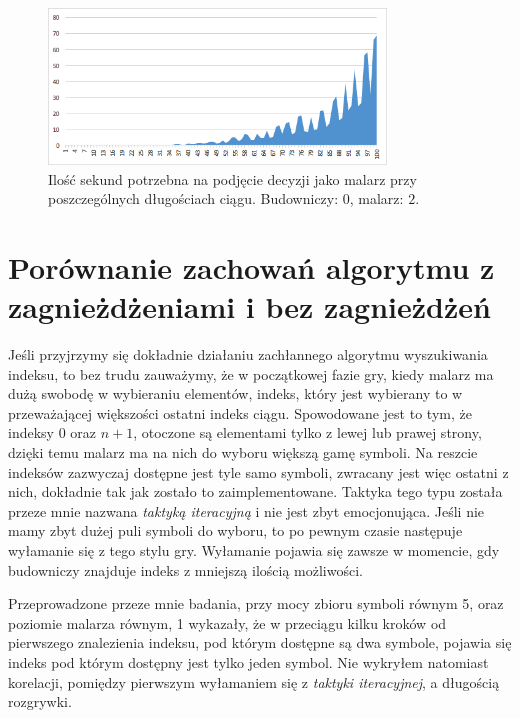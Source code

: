 \documentclass[document]{xmgr}
\begin{document}
\begin{figure}[tbh]
    \centering
    \includegraphics[width = 0.8\textwidth]{images/timePainter2Builder0}
    \caption{Ilość sekund potrzebna na podjęcie decyzji jako malarz przy poszczególnych długościach ciągu. Budowniczy: $0$, malarz: $2$.}
    \label{fig:painter2builder0}
\end{figure}


\section{Porównanie zachowań algorytmu z zagnieżdżeniami i bez zagnieżdżeń}
Jeśli przyjrzymy się dokładnie działaniu zachłannego algorytmu wyszukiwania indeksu, to bez trudu zauważymy, że w początkowej fazie gry, kiedy malarz ma dużą swobodę w wybieraniu elementów, indeks, który jest wybierany to w przeważającej większości ostatni indeks ciągu. Spowodowane jest to tym, że indeksy $0$ oraz $n+1$, otoczone są elementami tylko z lewej lub prawej strony, dzięki temu malarz ma na nich do wyboru większą gamę symboli. Na reszcie indeksów zazwyczaj dostępne jest tyle samo symboli, zwracany jest więc ostatni z nich, dokładnie tak jak zostało to zaimplementowane. Taktyka tego typu została przeze mnie nazwana \textit{taktyką iteracyjną} i nie jest zbyt emocjonująca. Jeśli nie mamy zbyt dużej puli symboli do wyboru, to po pewnym czasie następuje wyłamanie się z tego stylu gry. Wyłamanie pojawia się zawsze w momencie, gdy budowniczy znajduje indeks z mniejszą ilością możliwości. 

Przeprowadzone przeze mnie badania, przy mocy zbioru symboli równym 5, oraz poziomie malarza równym, 1 wykazały, że w przeciągu kilku kroków od pierwszego znalezienia indeksu, pod którym dostępne są dwa symbole, pojawia się indeks pod którym dostępny jest tylko jeden symbol. Nie wykryłem natomiast korelacji, pomiędzy pierwszym wyłamaniem się z \textit{taktyki iteracyjnej}, a długością rozgrywki. 
 
\end{document}
